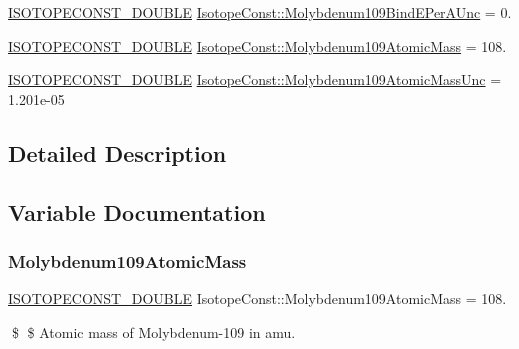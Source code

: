 \begin{DoxyCompactItemize}
\item 
\mbox{\hyperlink{group___isotope_const-_macros_ga8f45a7272ce02c0b4c65c44636ed719a}{I\+S\+O\+T\+O\+P\+E\+C\+O\+N\+S\+T\+\_\+\+D\+O\+U\+B\+LE}} \mbox{\hyperlink{group___isotope_const-_molybdenum-_mo109_ga451a55bfdd465b2760496d1db0efab34}{Isotope\+Const\+::\+Molybdenum109\+Bind\+E\+Per\+A\+Unc}} = 0.
\item 
\mbox{\hyperlink{group___isotope_const-_macros_ga8f45a7272ce02c0b4c65c44636ed719a}{I\+S\+O\+T\+O\+P\+E\+C\+O\+N\+S\+T\+\_\+\+D\+O\+U\+B\+LE}} \mbox{\hyperlink{group___isotope_const-_molybdenum-_mo109_ga7b7aa3d1350255cc2395a93d5316bd83}{Isotope\+Const\+::\+Molybdenum109\+Atomic\+Mass}} = 108.
\item 
\mbox{\hyperlink{group___isotope_const-_macros_ga8f45a7272ce02c0b4c65c44636ed719a}{I\+S\+O\+T\+O\+P\+E\+C\+O\+N\+S\+T\+\_\+\+D\+O\+U\+B\+LE}} \mbox{\hyperlink{group___isotope_const-_molybdenum-_mo109_gaea29f41d4f93740777706403b329ef9d}{Isotope\+Const\+::\+Molybdenum109\+Atomic\+Mass\+Unc}} = 1.\+201e-\/05
\end{DoxyCompactItemize}


\subsection{Detailed Description}


\subsection{Variable Documentation}
\mbox{\label{group___isotope_const-_molybdenum-_mo109_ga7b7aa3d1350255cc2395a93d5316bd83}} 
\subsubsection{\texorpdfstring{Molybdenum109\+Atomic\+Mass}{Molybdenum109AtomicMass}}
{\footnotesize\ttfamily \mbox{\hyperlink{group___isotope_const-_macros_ga8f45a7272ce02c0b4c65c44636ed719a}{I\+S\+O\+T\+O\+P\+E\+C\+O\+N\+S\+T\+\_\+\+D\+O\+U\+B\+LE}} Isotope\+Const\+::\+Molybdenum109\+Atomic\+Mass = 108.}

\$ \$ Atomic mass of Molybdenum-\/109 in amu. \mbox{\label{group___isotope_const-_molybdenum-_mo109_gaea29f41d4f93740777706403b329ef9d}} 
